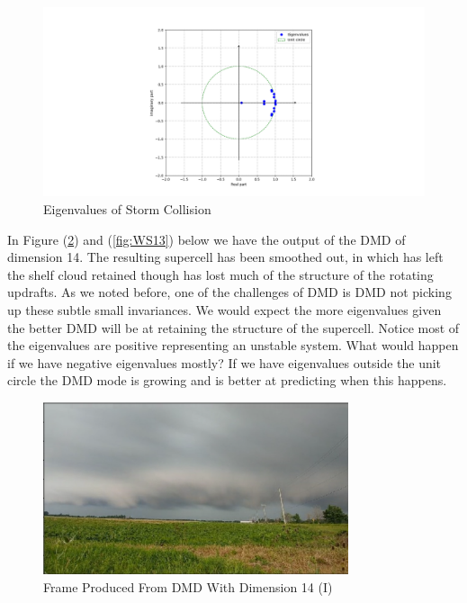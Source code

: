 \documentclass[12pt]{report}
\begin{document}
\begin{figure}[H]
    \centering
    \includegraphics[width=1.3\textwidth]{Weather pics/WS11.png}
    \caption{Eigenvalues of Storm Collision} \label{fig:WS11}
\end{figure}
\noindent

In Figure (\ref{fig:WS12}) and (\ref{fig:WS13}) below we have the output of the DMD of dimension 14. The resulting supercell has been smoothed out, in which has left the shelf cloud retained though has lost much of the structure of the rotating updrafts. As we noted before, one of the challenges of DMD is DMD not picking up these subtle small invariances. We would expect the more eigenvalues given the better DMD will be at retaining the structure of the supercell. Notice most of the eigenvalues are positive representing an unstable system. What would happen if we have negative eigenvalues mostly? If we have eigenvalues outside the unit circle the DMD mode is growing and is better at predicting when this happens.

\begin{figure}[H]
    \centering
    \includegraphics[width=0.8\textwidth]{Weather pics/WS12.png}
    \caption{Frame Produced From DMD With Dimension 14 (I)} \label{fig:WS12}
\end{figure}
\noindent
\end{document}
